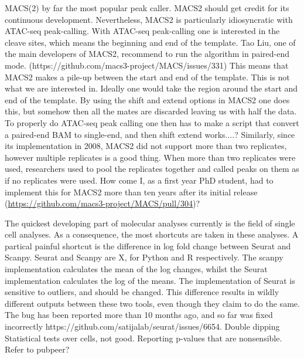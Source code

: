 MACS(2) by far the most popular peak caller. MACS2 should get credit for its continuous development. Nevertheless, MACS2 is particularly idiosyncratic with ATAC-seq peak-calling. With ATAC-seq peak-calling one is interested in the cleave sites, which means the beginning and end of the template. Tao Liu, one of the main developers of MACS2, recommend to run the algorithm in paired-end mode. (https://github.com/macs3-project/MACS/issues/331) This means that MACS2 makes a pile-up between the start and end of the template. This is not what we are interested in. Ideally one would take the region around the start and end of the template. By using the shift and extend options in MACS2 one does this, but somehow then all the mates are discarded leaving us with half the data. To properly do ATAC-seq peak calling one then has to make a script that convert a paired-end BAM to single-end, and then shift extend works....? Similarly, since its implementation in 2008, MACS2 did not support more than two replicates, however multiple replicates is a good thing. When more than two replicates were used, researchers used to pool the replicates together and called peaks on them as if no replicates were used. How come I, as a first year PhD student, had to implement this for MACS2 more than ten years after its initial release (\url{https://github.com/macs3-project/MACS/pull/304})?

The quickest developing part of molecular analyses currently is the field of single cell analyses. As a consequence, the most shortcuts are taken in these analyses. A partical painful shortcut is the difference in log fold change between Seurat and Scanpy. Seurat and Scanpy are X, for Python and R respectively. The scanpy implementation calculates the mean of the log changes, whilst the Seurat implementation calculates the log of the means. The implementation of Seurat is sensitive to outliers, and should be changed. This difference results in wildly different outputs between these two tools, even though they claim to do the same. The bug has been reported more than 10 months ago, and so far was fixed incorrectly https://github.com/satijalab/seurat/issues/6654. Double dipping
Statistical tests over cells, not good. 
Reporting p-values that are nonsensible.
Refer to pubpeer?

